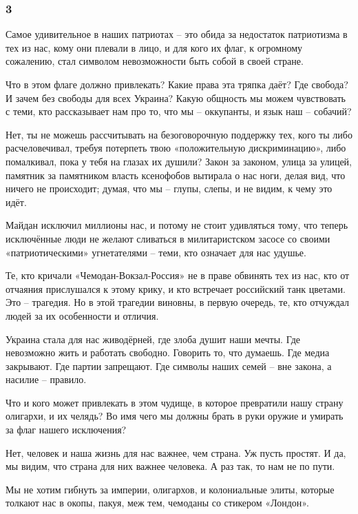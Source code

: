  
 
 
 
 

\subsubsection{3}

Самое удивительное в наших патриотах – это обида за недостаток патриотизма в
тех из нас, кому они плевали в лицо, и для кого их флаг, к огромному сожалению,
стал символом невозможности быть собой в своей стране.

Что в этом флаге должно привлекать? Какие права эта тряпка даёт? Где свобода? И
зачем без свободы для всех Украина? Какую общность мы можем чувствовать с теми,
кто рассказывает нам про то, что мы – оккупанты, и язык наш – собачий?

Нет, ты не можешь рассчитывать на безоговорочную поддержку тех, кого ты либо
расчеловечивал, требуя потерпеть твою «положительную дискриминацию», либо
помалкивал, пока у тебя на глазах их душили? Закон за законом, улица за улицей,
памятник за памятником власть ксенофобов вытирала о нас ноги, делая вид, что
ничего не происходит; думая, что мы – глупы, слепы, и не видим, к чему это
идёт.   

Майдан исключил миллионы нас, и потому не стоит удивляться тому, что теперь
исключённые люди не желают сливаться в милитаристском засосе со своими
«патриотическими» угнетателями – теми, кто означает для нас удушье.

Те, кто кричали «Чемодан-Вокзал-Россия» не в праве обвинять тех из нас, кто от
отчаяния прислушался к этому крику, и кто встречает российский танк цветами.
Это – трагедия. Но в этой трагедии виновны, в первую очередь, те, кто отчуждал
людей за их особенности и отличия.

Украина стала для нас живодёрней, где злоба душит наши мечты. Где невозможно
жить и работать свободно. Говорить то, что думаешь. Где медиа закрывают. Где
партии запрещают. Где символы наших семей – вне закона, а насилие – правило.

Что и кого может привлекать в этом чудище, в которое превратили нашу страну
олигархи, и их челядь? Во имя чего мы должны брать в руки оружие и умирать за
флаг нашего исключения? 

Нет, человек и наша жизнь для нас важнее, чем страна. Уж пусть простят. И да,
мы видим, что страна для них важнее человека. А раз так, то нам не по пути. 

Мы не хотим гибнуть за империи, олигархов, и колониальные элиты, которые
толкают нас в окопы, пакуя, меж тем, чемоданы со стикером «Лондон».

